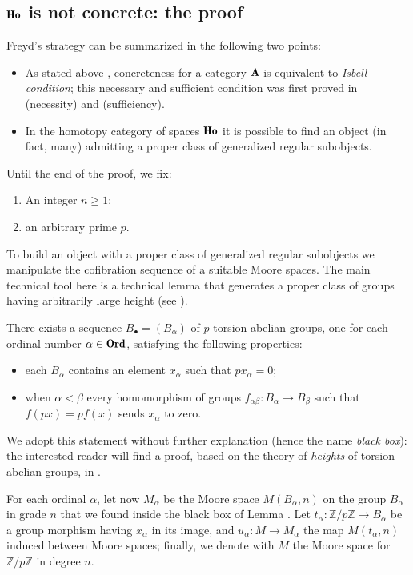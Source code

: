 \documentclass[a4paper, 10pt]{amsart}
\begin{document}
\subsection{$\cate{Ho}$ is not concrete: the proof}
Freyd's strategy can be summarized in the following two points:
\begin{itemize}
	\item As stated above , concreteness for a category $\A$ is equivalent to \emph{Isbell condition}; this necessary and sufficient condition was first proved in \cite{Isbell1964} (necessity) and \cite{fconc} (sufficiency).
	\item In the homotopy category of spaces $\cate{Ho}$ it is possible to find an object (in fact, many) admitting a proper class of generalized regular subobjects.
\end{itemize}
Until the end of the proof, we fix:
\begin{enumerate}
	\item An integer $n\ge 1$;
	\item an arbitrary prime $p$.
\end{enumerate}
To build an object with a proper class of generalized regular subobjects we manipulate the cofibration sequence of a suitable Moore spaces. The main technical tool here is a technical lemma that generates a proper class of groups having arbitrarily large height (see \cite{fuchs2015abelian}). 
\begin{lemma}\label{spastic}
There exists a sequence $B_\bullet = (B_\alpha)$ of $p$-torsion abelian groups, one for each ordinal number $\alpha\in\cate{Ord}$, satisfying the following properties:
\begin{itemize}
	\item each $B_\alpha$ contains an element $x_\alpha$ such that $p x_\alpha = 0$;
	\item when $\alpha < \beta$ every homomorphism of groups $f_{\alpha\beta} \colon B_\alpha \to B_\beta$ such that $f(px)=p f(x)$ sends $x_\alpha$ to zero.
\end{itemize}
\end{lemma}
We adopt this statement without further explanation (hence the name \emph{black box}): the interested reader will find a proof, based on the theory of \emph{heights} of torsion abelian groups, in \cite{Freydconc}.
\begin{notat}
For each ordinal $\alpha$, let now $M_\alpha$ be the Moore space $M(B_\alpha,n)$ on the group $B_\alpha$  in grade $n$ that we found inside the black box of Lemma . Let $t_\alpha\colon \mathbb{Z}/p\mathbb{Z} \to B_\alpha$ be a group morphism having $x_\alpha$ in its image, and $u_\alpha\colon M \to M_\alpha$ the map $M(t_\alpha,n)$ induced between Moore spaces; finally, we denote with $M$ the Moore space for $\mathbb{Z}/p\mathbb{Z}$ in degree $n$.
\end{notat}
\end{document}
